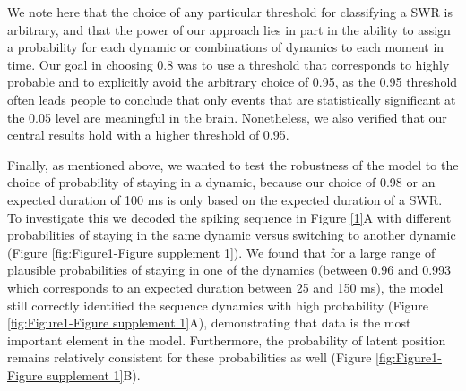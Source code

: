 \documentclass[times, twoside]{zHenriquesLab-StyleBioRxiv}
\begin{document}
We note here that the choice of any particular threshold for classifying a SWR is arbitrary, and that the power of our approach lies in part in the ability to assign a probability for each dynamic or combinations of dynamics to each moment in time. Our goal in choosing 0.8 was to use a threshold that corresponds to highly probable and to explicitly avoid the arbitrary choice of 0.95, as the 0.95 threshold often leads people to conclude that only events that are statistically significant at the 0.05 level are meaningful in the brain. Nonetheless, we also verified that our central results hold with a higher threshold of 0.95. 

Finally, as mentioned above, we wanted to test the robustness of the model to the choice of probability of staying in a dynamic, because our choice of 0.98 or an expected duration of 100 ms is only based on the expected duration of a SWR. To investigate this we decoded the spiking sequence in Figure \ref{1}A with different probabilities of staying in the same dynamic versus switching to another dynamic (Figure \ref{fig:Figure1-Figure supplement 1}). We found that for a large range of plausible probabilities of staying in one of the dynamics (between 0.96 and 0.993 which corresponds to an expected duration between 25 and 150 ms), the model still correctly identified the sequence dynamics with high probability (Figure \ref{fig:Figure1-Figure supplement 1}A), demonstrating that data is the most important element in the model. Furthermore, the probability of latent position remains relatively consistent for these probabilities as well (Figure \ref{fig:Figure1-Figure supplement 1}B).
\end{document}
